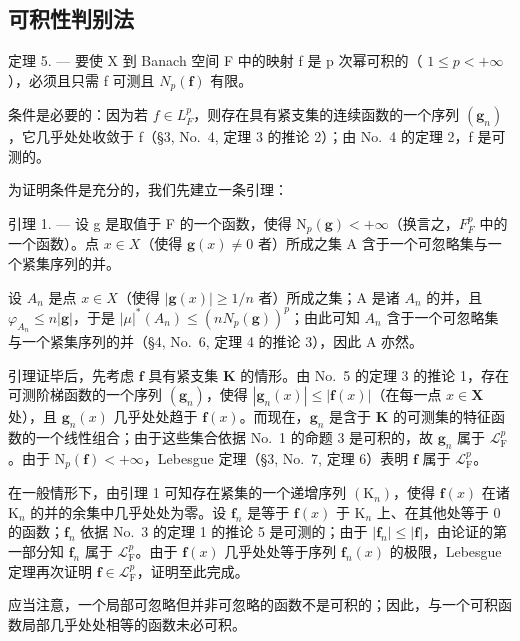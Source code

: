 \subsection{可积性判别法}

定理 5. --- 要使 X 到 Banach 空间 F 中的映射 f 是 p 次幂可积的（ \(1 \leqslant p < +\infty\) ），必须且只需 f 可测且 \(N_{p}(\mathbf{f})\) 有限。

条件是必要的：因为若 \(f \in L_{F}^{p}\)，则存在具有紧支集的连续函数的一个序列 \((\mathbf{g}_{n})\)，它几乎处处收敛于 f（§3, No.~4, 定理 3 的推论 2）；由 No.~4 的定理 2，f 是可测的。

为证明条件是充分的，我们先建立一条引理：

引理 1. --- 设 g 是取值于 F 的一个函数，使得 \(\mathrm{N}_{p}(\mathbf{g}) < +\infty\)（换言之，\(F_{F}^{p}\) 中的一个函数）。点 \(x \in X\)（使得 \(\mathbf{g}(x) \neq 0\) 者）所成之集 A 含于一个可忽略集与一个紧集序列的并。

设 \(A_{n}\) 是点 \(x \in X\)（使得 \(|\mathbf{g}(x)| \geqslant 1/n\) 者）所成之集；A 是诸 \(A_{n}\) 的并，且 \(\varphi_{A_{n}} \leqslant n|\mathbf{g}|\)，于是 \(|\mu|^{*}(A_{n}) \leqslant (nN_{p}(\mathbf{g}))^{p}\)；由此可知 \(A_{n}\) 含于一个可忽略集与一个紧集序列的并（§4, No.~6, 定理 4 的推论 3），因此 A 亦然。

引理证毕后，先考虑 \(\mathbf{f}\) 具有紧支集 \(\mathbf{K}\) 的情形。由 No.~5 的定理 3 的推论 1，存在可测阶梯函数的一个序列 \((\mathbf{g}_n)\)，使得 \(|\mathbf{g}_n(x)| \leqslant |\mathbf{f}(x)|\)（在每一点 \(x \in \mathbf{X}\) 处），且 \(\mathbf{g}_n(x)\) 几乎处处趋于 \(\mathbf{f}(x)\)。而现在，\(\mathbf{g}_n\) 是含于 \(\mathbf{K}\) 的可测集的特征函数的一个线性组合；由于这些集合依据 No.~1 的命题 3 是可积的，故 \(\mathbf{g}_n\) 属于 \(\mathcal{L}_{\mathrm{F}}^p\)。由于 \(\mathrm{N}_p(\mathbf{f}) < +\infty\)，Lebesgue 定理（§3, No.~7, 定理 6）表明 \(\mathbf{f}\) 属于 \(\mathcal{L}_{\mathrm{F}}^p\)。

在一般情形下，由引理 1 可知存在紧集的一个递增序列 \((\mathrm{K}_n)\)，使得 \(\mathbf{f}(x)\) 在诸 \(\mathrm{K}_n\) 的并的余集中几乎处处为零。设 \(\mathbf{f}_n\) 是等于 \(\mathbf{f}(x)\) 于 \(\mathrm{K}_n\) 上、在其他处等于 0 的函数；\(\mathbf{f}_n\) 依据 No.~3 的定理 1 的推论 5 是可测的；由于 \(|\mathbf{f}_n| \leqslant |\mathbf{f}|\)，由论证的第一部分知 \(\mathbf{f}_n\) 属于 \(\mathcal{L}_{\mathrm{F}}^p\)。由于 \(\mathbf{f}(x)\) 几乎处处等于序列 \(\mathbf{f}_n(x)\) 的极限，Lebesgue 定理再次证明 \(\mathbf{f} \in \mathcal{L}_{\mathrm{F}}^p\)，证明至此完成。

应当注意，一个局部可忽略但并非可忽略的函数不是可积的；因此，与一个可积函数局部几乎处处相等的函数未必可积。

